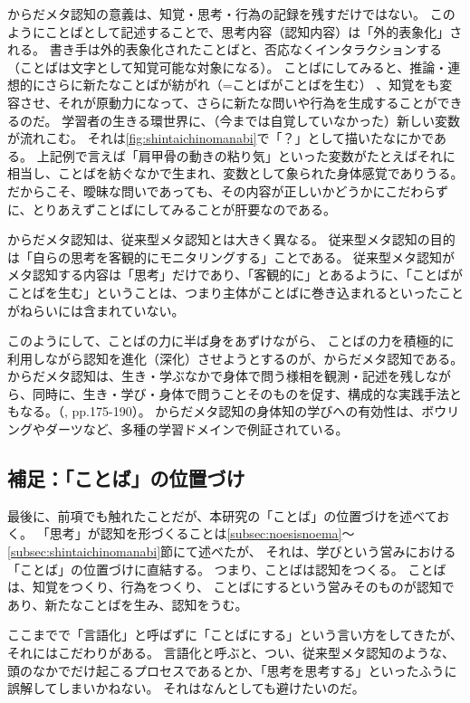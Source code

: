からだメタ認知の意義は、知覚・思考・行為の記録を残すだけではない。
このようにことばとして記述することで、思考内容（認知内容）は「外的表象化」される。
書き手は外的表象化されたことばと、否応なくインタラクションする（ことばは文字として知覚可能な対象になる）。
ことばにしてみると、推論・連想的にさらに新たなことばが紡がれ（=ことばがことばを生む\cite{suwa:2016}）
、知覚をも変容させ、それが原動力になって、さらに新たな問いや行為を生成することができるのだ。
学習者の生きる環世界に、（今までは自覚していなかった）新しい変数が流れこむ。
それは\autoref{fig:shintaichinomanabi}で「？」として描いたなにかである。
上記例で言えば「肩甲骨の動きの粘り気」といった変数がたとえばそれに相当し、ことばを紡ぐなかで生まれ、変数として象られた身体感覚でありうる。
だからこそ、曖昧な問いであっても、その内容が正しいかどうかにこだわらずに、とりあえずことばにしてみることが肝要なのである。

からだメタ認知は、従来型メタ認知\cite{flavell:1979}とは大きく異なる。
従来型メタ認知の目的は「自らの思考を客観的にモニタリングする」ことである。
従来型メタ認知がメタ認知する内容は「思考」だけであり、「客観的に」とあるように、「ことばがことばを生む」ということは、つまり主体がことばに巻き込まれるといったことがねらいには含まれていない。

このようにして、ことばの力に半ば身をあずけながら、
ことばの力を積極的に利用しながら認知を進化（深化）させようとするのが、からだメタ認知である。
からだメタ認知は、生き・学ぶなかで身体で問う様相を観測・記述を残しながら、同時に、生き・学び・身体で問うことそのものを促す、構成的な実践手法ともなる。（\cite{suwa_fujii:2015}, pp.175-190）。
からだメタ認知の身体知の学びへの有効性は、ボウリングやダーツなど、多種の学習ドメインで例証されている\cite{suwa:2016}\cite{suwa:2022}。

\subsection{補足：「ことば」の位置づけ}
最後に、前項でも触れたことだが、本研究の「ことば」の位置づけを述べておく。
「思考」が認知を形づくることは\ref{subsec:noesisnoema}〜\ref{subsec:shintaichinomanabi}節にて述べたが、
それは、学びという営みにおける「ことば」の位置づけに直結する。
つまり、ことばは認知をつくる。
ことばは、知覚をつくり、行為をつくり、
ことばにするという営みそのものが認知であり、新たなことばを生み、認知をうむ。

ここまでで「言語化」と呼ばずに「ことばにする」という言い方をしてきたが、それにはこだわりがある。
言語化と呼ぶと、つい、従来型メタ認知のような、頭のなかでだけ起こるプロセスであるとか、「思考を思考する」といったふうに誤解してしまいかねない。
それはなんとしても避けたいのだ。

